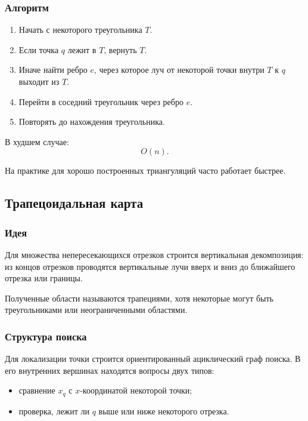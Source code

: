\documentclass[12pt,a4paper]{article}
\begin{document}
\subsubsection{Алгоритм}

\begin{enumerate}
    \item Начать с некоторого треугольника \(T\).
    \item Если точка \(q\) лежит в \(T\), вернуть \(T\).
    \item Иначе найти ребро \(e\), через которое луч от некоторой точки внутри \(T\) к \(q\) выходит из \(T\).
    \item Перейти в соседний треугольник через ребро \(e\).
    \item Повторять до нахождения треугольника.
\end{enumerate}

В худшем случае:
\[
O(n).
\]

На практике для хорошо построенных триангуляций часто работает быстрее.

\subsection{Трапецоидальная карта}

\subsubsection{Идея}

Для множества непересекающихся отрезков строится вертикальная декомпозиция: из концов отрезков проводятся вертикальные лучи вверх и вниз до ближайшего отрезка или границы.

Полученные области называются трапециями, хотя некоторые могут быть треугольниками или неограниченными областями.

\subsubsection{Структура поиска}

Для локализации точки строится ориентированный ациклический граф поиска. В его внутренних вершинах находятся вопросы двух типов:

\begin{itemize}
    \item сравнение \(x_q\) с \(x\)-координатой некоторой точки;
    \item проверка, лежит ли \(q\) выше или ниже некоторого отрезка.
\end{itemize}
\end{document}
